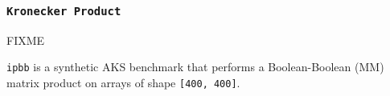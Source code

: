 \subsubsection{\tt Kronecker Product}
\label{benchmarkkroneckerproduct}


FIXME

{\tt ipbb} is a synthetic AKS benchmark that performs
a Boolean-Boolean ({\apl M\qor\qdot\qand\qtran\0M}) matrix product on 
arrays of shape {\tt [400, 400]}.

